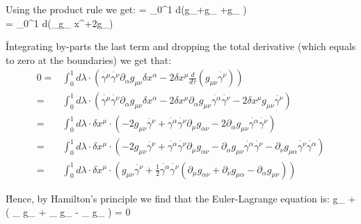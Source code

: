Using the product rule we get:
= \int_0^1 d\lambda \cdot \left(\dot{\gamma^{\mu}}\dot{\gamma^{\nu}}\delta g_{\mu \nu }+g_{\mu \nu}
\dot{\delta\gamma^{\mu}}\dot{\gamma^{\nu}}+g_{\mu \nu} \dot{\gamma^{\mu}}\dot{\delta\gamma^{\nu}}\right) \\
= \int_0^1 d\lambda \cdot \left(\dot{\gamma^{\mu}}\dot{\gamma^{\nu}}\partial_{\alpha }g_{\mu \nu }\delta
x^{\alpha}+2g_{\mu \nu }\dot{\delta\gamma^{\mu}}\dot{\gamma^{\nu}}\right)
\ese

\v

Integrating by-parts the last term and dropping the total derivative (which equals to zero at the boundaries) we get
that:
\begin{align*}
0 = & \int_0^1 d\lambda \cdot \left (\dot{\gamma^{\mu}}\dot{\gamma^{\nu}}\partial _{\alpha }g_{\mu \nu }\delta
x^{\alpha }-2\delta x^{\mu }{\frac {d}{d\tau }}\left(g_{\mu \nu}\dot{\gamma^{\nu}}\right)\right)\\[5pt]
=& \int_0^1 d\lambda \cdot \left (\dot{\gamma^{\mu}}\dot{\gamma^{\nu}}\partial _{\alpha }g_{\mu \nu }\delta
x^{\alpha }- 2\delta x^{\mu } \partial _{\alpha }g_{\mu \nu } \dot{\gamma^{\alpha}} \dot{\gamma^{\nu}}-2\delta
x^{\mu }g_{\mu \nu } \ddot{\gamma^{\nu}}\right)\\[5pt]
=& \int_0^1 d\lambda \cdot \delta x^{\mu } \cdot \left(-2 g_{\mu \nu } \ddot{\gamma^{\nu}} +
\dot{\gamma^{\alpha}} \dot{\gamma^{\nu}} \partial _{\mu }g_{\alpha \nu } - 2 \partial _{\alpha } g_{\mu \nu }
\dot{\gamma^{\alpha}} \dot{\gamma^{\nu}} \right)\\[5pt]
=& \int_0^1 d\lambda \cdot \delta x^{\mu } \cdot \left(-2 g_{\mu \nu } \ddot{\gamma^{\nu}} + \dot{\gamma^{\alpha}}
\dot{\gamma^{\nu}} \partial _{\mu }g_{\alpha \nu } - \partial _{\alpha } g_{\mu \nu } \dot{\gamma^{\alpha}}
\dot{\gamma^{\nu}} - \partial _{\nu } g_{\mu \alpha } \dot{\gamma^{\nu}} \dot{\gamma^{\alpha}} \right)\\[5pt]
=& \int_0^1 d\lambda \cdot \delta x^{\mu } \cdot \left(g_{\mu \nu } \ddot{\gamma^{\nu}} + \frac{1}{2}
\dot{\gamma^{\alpha}} \dot{\gamma^{\nu}} \left( \partial _{\mu } g_{\alpha \nu } + \partial _{\nu } g_{\mu \alpha}
- \partial _{\alpha } g_{\mu \nu } \right) \right)
\end{align*}

\v

Hence, by Hamilton's principle we find that the Euler-Lagrange equation is:
\bse
g_{\mu \nu } \ddot{\gamma^{\nu}} +  \dot{\gamma^{\alpha}} \dot{\gamma^{\nu}} \left( \partial _{\mu }
g_{\alpha \nu } + \partial _{\nu } g_{\mu \alpha } - \partial _{\alpha } g_{\mu \nu } \right) = 0
\ese

